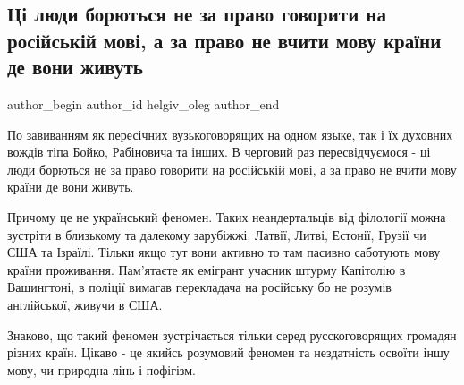  
 
 
 
 
 
\subsection{Ці люди борються не за право говорити на російській мові, а за право не вчити мову країни де вони живуть}
\label{sec:17_01_2021.fb.helgiv_oleg.1.ludi_zakon_mova}
 
\ifcmt
 author_begin
   author_id helgiv_oleg
 author_end
\fi

По завиванням як пересічних вузькоговорящих на одном языке, так і їх духовних
вождів тіпа Бойко, Рабіновича та інших. В черговий раз пересвідчуємося - ці
люди борються не за право говорити на російській мові, а за право не вчити мову
країни де вони живуть. 

Причому це не український феномен. Таких неандертальців від філології можна
зустріти в близькому та далекому зарубіжжі. Латвії, Литві, Естонії, Грузії чи
США та Ізраїлі. Тільки якщо тут вони активно то там пасивно саботують мову
країни проживання. Пам'ятаєте як емігрант учасник штурму Капітолію в
Вашингтоні, в поліції вимагав перекладача на російську бо не розумів
англійської, живучи в США.

Знаково, що такий феномен зустрічається тільки серед русскоговорящих громадян
різних країн. Цікаво - це якийсь розумовий феномен та нездатність освоїти іншу
мову, чи природна лінь і пофігізм.

